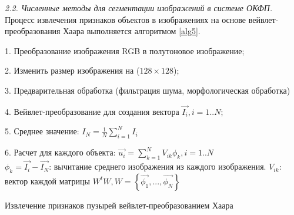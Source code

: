 \textit{2.2. Численные методы для сегментации изображений в системе ОКФП.} Процесс извлечения признаков объектов в изображениях на основе вейвлет-преобразования Хаара выполняется алгоритмом \ref{alg5}.%
%
%
%
%
%
%
%

\begin{algorithm}[ht!]
		1. Преобразование изображения RGB в полутоновое изображение;

		2. Изменить размер изображения на ($128 \times 128$);

		3. Предварительная обработка (фильтрация шума, морфологическая обработка)

		4. Вейвлет-преобразование для создания вектора $\vec{I_i}, i=1..N$;

		5. Среднее значение: $I_N=\frac{1}{N}\sum_{i=1}^N I_i$

		6. Расчет для каждого объекта: $\vec{u_i}=\sum_{k=1}^N V_{ik} \phi_k, i=1..N$\\
		$\phi_k=\vec{I_i}-\vec{I_N}$: вычитание среднего изображения из каждого изображения.
			$V_{ik}$: вектор каждой матрицы $W^tW, W=\left\{\vec{\phi_1},...,\vec{\phi_N}\right\} $
  \caption{Извлечение признаков пузырей вейвлет-преобразованием Хаара}\label{alg5}
\end{algorithm}

